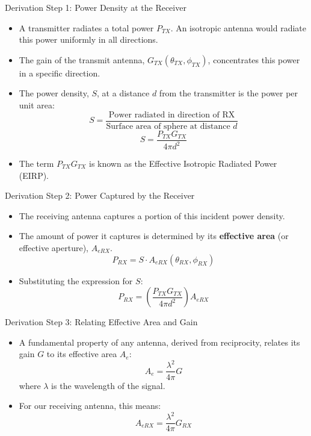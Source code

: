\documentclass{beamer}
\begin{document}
	\begin{frame}{Derivation Step 1: Power Density at the Receiver}
		\begin{itemize}
			\item A transmitter radiates a total power $P_{TX}$. An isotropic antenna would radiate this power uniformly in all directions.
			\item The gain of the transmit antenna, $G_{TX}(\theta_{TX}, \phi_{TX})$, concentrates this power in a specific direction.
			\item The power density, $S$, at a distance $d$ from the transmitter is the power per unit area:
			\[ S = \frac{\text{Power radiated in direction of RX}}{\text{Surface area of sphere at distance } d} \]
			\[ S = \frac{P_{TX} G_{TX}}{4\pi d^2} \]
			\item The term $P_{TX} G_{TX}$ is known as the Effective Isotropic Radiated Power (EIRP).
		\end{itemize}
	\end{frame}
	
	\begin{frame}{Derivation Step 2: Power Captured by the Receiver}
		\begin{itemize}
			\item The receiving antenna captures a portion of this incident power density.
			\item The amount of power it captures is determined by its \textbf{effective area} (or effective aperture), $A_{eRX}$.
			\[ P_{RX} = S \cdot A_{eRX}(\theta_{RX}, \phi_{RX}) \]
			\item Substituting the expression for $S$:
			\[ P_{RX} = \left( \frac{P_{TX} G_{TX}}{4\pi d^2} \right) A_{eRX} \]
		\end{itemize}
	\end{frame}
	
	\begin{frame}{Derivation Step 3: Relating Effective Area and Gain}
		\begin{itemize}
			\item A fundamental property of any antenna, derived from reciprocity, relates its gain $G$ to its effective area $A_e$:
			\[ A_e = \frac{\lambda^2}{4\pi} G \]
			where $\lambda$ is the wavelength of the signal.
			\item For our receiving antenna, this means:
			\[ A_{eRX} = \frac{\lambda^2}{4\pi} G_{RX} \]
		\end{itemize}
	\end{frame}
	
\end{document}
